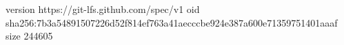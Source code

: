 version https://git-lfs.github.com/spec/v1
oid sha256:7b3a54891507226d52f814ef763a41aecccbe924e387a600e71359751401aaaf
size 244605
